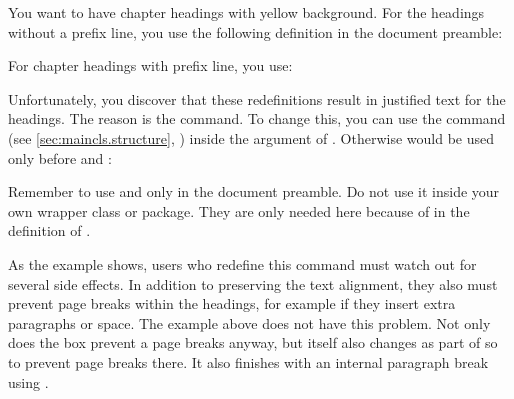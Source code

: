 \begin{Example}
  You want to have chapter headings with yellow background. For the headings
  without a prefix line, you use the following definition in the document
  preamble:
\begin{lstcode}
  \makeatletter
  \renewcommand{\chapterlinesformat}[3]{%
    \colorbox{yellow}{%
      \parbox{\dimexpr\linewidth-2\fboxrule-2\fboxsep}{%
        \@hangfrom{#2}#3%
      }%
    }%
  }
  \makeatother
\end{lstcode}
  For chapter headings with prefix line, you use:
\begin{lstcode}
  \renewcommand{\chapterlineswithprefixformat}[3]{%
    \colorbox{yellow}{%
      \parbox{\dimexpr\linewidth-2\fboxrule-2\fboxsep}{%
        #2#3%
      }%
    }%
  }
\end{lstcode}
  Unfortunately, you discover that these redefinitions result in justified
  text for the headings. The reason is the  command. To change
  this, you can use the  command (see
  \autoref{sec:maincls.structure}, )
  inside the argument of . Otherwise  would
  be used only before  and
  :
\begin{lstcode}
  \makeatletter
  \renewcommand{\chapterlinesformat}[3]{%
    \colorbox{yellow}{%
      \parbox{\dimexpr\linewidth-2\fboxrule-2\fboxsep}{%
        \raggedchapter
        \@hangfrom{#2}#3%
      }%
    }%
  }
  \makeatother
  \renewcommand{\chapterlineswithprefixformat}[3]{%
    \colorbox{yellow}{%
      \parbox{\dimexpr\linewidth-2\fboxrule-2\fboxsep}{%
        \raggedchapter
        #2#3%
      }%
    }%
  }
\end{lstcode}
  Remember to use  and  only in the
  document preamble. Do not use it inside your own wrapper class or package.
  They are only needed here because of  in the definition of
  .
\end{Example}

As the example shows, users who redefine this command must watch out for
several side effects. In addition to preserving the text alignment, they also
must prevent page breaks within the headings, for example if they insert extra
paragraphs or space. The example above does not have this problem. Not only
does the box prevent a page breaks anyway, but \KOMAScript{} itself also
changes  as part of  so to prevent page
breaks there. It also finishes  with an internal paragraph break
using .

